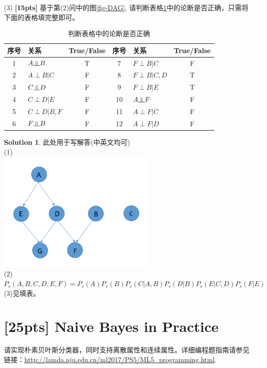 \documentclass[a4paper,UTF8]{article}
\numberwithin{equation}{section}
\theoremstyle{definition}
\newtheorem*{solution}{Solution}
\newcommand{\indep}{\rotatebox[origin=c]{90}{$\models$}}
\begin{document}
(3) \textbf{[15pts]} 基于第(2)问中的图\ref{fig-DAG}, 请判断表格\ref{table:DAG}中的论断是否正确，只需将下面的表格填完整即可。
\begin{table}[h]
\centering
\caption{判断表格中的论断是否正确}
\label{table:DAG}
\begin{tabular}{c|l|c||c|l|c}\hline
序号   		& 		关系  			& True/False 	& 序号   	& 		关系  			& True/False \\ \hline
1			&	$A \indep B$ 		    & 	T		    & 7  		& 	$F \perp B|C$ 		& 	F		 \\
2			&	$A \perp B|C$ 	    & 	F		    & 8  		& 	$F \perp B|C, D$ 	& 	T		 \\
3			&	$C \indep D $		    & 	F		    & 9  		& 	$F \perp B|E$ 		& 	T		 \\
4			&	$C \perp D|E$ 	    & 	F		    & 10  		& 	$A \indep F $			& 		F	 \\
5			&	$C \perp D|B, F$     & 		F	    & 11  		& 	$A \perp F|C$ 		& 	F		 \\
6			&	$F \indep B $		    & 	F		    & 12  		& 	$A \perp F|D$ 		& 	F		 \\ \hline
\end{tabular}
\end{table}

\begin{solution}
此处用于写解答(中英文均可)\\
(1)\\
\includegraphics[height=6cm]{pic.png}\\
(2)$P_r(A,B,C,D,E,F)=P_r(A)P_r(B)P_r(C|A,B)P_r(D|B)P_r(E|C,D)P_r(F|E)$\\
(3)见填表。
\end{solution}


\section{[25pts] Naive Bayes in Practice}
请实现朴素贝叶斯分类器，同时支持离散属性和连续属性。详细编程题指南请参见链接：\url{http://lamda.nju.edu.cn/ml2017/PS5/ML5_programming.html}. 
\end{document}
